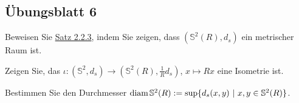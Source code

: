 \documentclass[11pt]{book}
\numberwithin{dummy}{section}
\theoremstyle{nonumberbreak}
\newenvironment{prob}[1][]{\ifthenelse{\equal{#1}{}}{\problem}{\problem[#1]}\rm}{\endproblem}
\newenvironment{sol}[1][]{\ifthenelse{\equal{#1}{}}{\solution}{\solution[#1]}\rm}{\endsolution}
\newcommand{\Sph}{\mathbb{S}}
\newcommand{\la}{\longrightarrow}
\begin{document}
\begin{spacing}{1.4}
\begin{prob}
\begin{sol}
\end{sol}




\end{prob}









\newpage




\titlespacing*{\section}{-16.5pt}{0pt}{20pt}
\renewcommand*\thesection{}
\section{Übungsblatt 6} %
\renewcommand*\thesection{\arabic{section}}









\hypertarget{Asechseins}{}
\begin{prob}  %
\begin{compactenum}
\item Beweisen Sie \hyperlink{satzzweizweidrei}{Satz 2.2.3}, indem Sie zeigen, dass $(\Sph^2(R), d_s)$ ein metrischer Raum ist.
\item Zeigen Sie, das $\iota: (\Sph^2, d_s) \la (\Sph^2(R), \frac{1}{R}d_s)$, $x \mapsto Rx$ eine Isometrie ist.
\item Bestimmen Sie den Durchmesser $\mathrm{diam}\hspace{1.5pt} \Sph^2(R) := \sup \{d_s(x,y) \ \vert \ x,y \in \Sph^2(R)\}$.
\end{compactenum}


\end{prob}
\end{spacing}
\end{document}
